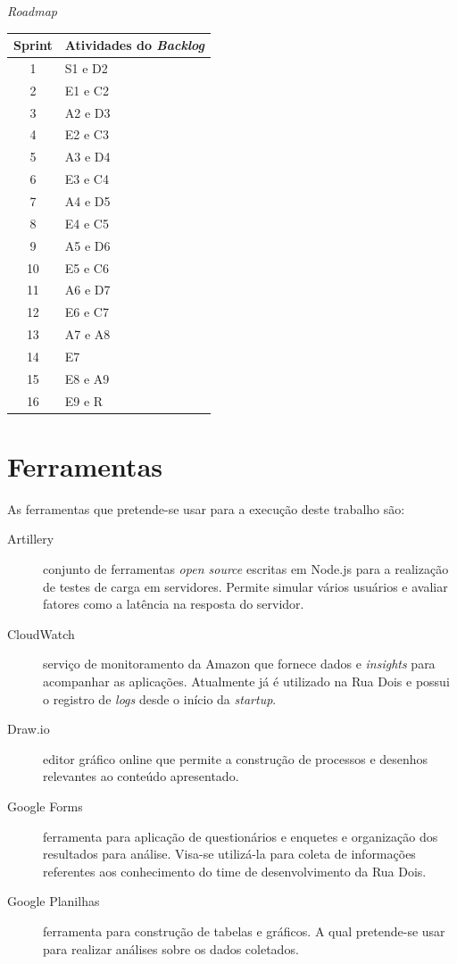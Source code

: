 \begin{quadro}
    \caption{\textit{Roadmap}\label{quad:Roadmap}}
    \begin{tabular}{ | c | l | }
    \hline
    \textbf{Sprint} &
        \textbf{Atividades do \textit{Backlog}} \\ \hline
        1 & S1 e D2 \\ \hline
        2 & E1 e C2 \\ \hline
        3 & A2 e D3 \\ \hline
        4 & E2 e C3 \\ \hline
        5 & A3 e D4 \\ \hline
        6 & E3 e C4 \\ \hline
        7 & A4 e D5 \\ \hline
        8 & E4 e C5 \\ \hline
        9 & A5 e D6 \\ \hline
        10 & E5 e C6 \\ \hline
        11 & A6 e D7 \\ \hline
        12 & E6 e C7 \\ \hline
        13 & A7 e A8 \\ \hline
        14 & E7 \\ \hline
        15 & E8 e A9 \\ \hline
        16 & E9 e R \\ \hline
    \end{tabular}
\end{quadro}

\section{Ferramentas}

As ferramentas que pretende-se usar para a execução deste trabalho são:

\begin{description}
    \item[Artillery] conjunto de ferramentas \textit{open source} escritas em Node.js
    para a realização de testes de carga em servidores. Permite simular vários usuários
    e avaliar fatores como a latência na resposta do servidor.
    \item[CloudWatch] serviço de monitoramento da Amazon que fornece dados e
    \textit{insights} para acompanhar as aplicações. Atualmente já é utilizado na
    Rua Dois e possui o registro de \textit{logs} desde o início da \textit{startup}.
    \item[Draw.io] editor gráfico online que permite a construção de processos e
    desenhos relevantes ao conteúdo apresentado.
    \item[Google Forms] ferramenta para aplicação de questionários e enquetes
    e organização dos resultados para análise. Visa-se utilizá-la para coleta
    de informações referentes aos conhecimento do time de desenvolvimento da Rua Dois.
    \item[Google Planilhas] ferramenta para construção de tabelas e gráficos.
    A qual pretende-se usar para realizar análises sobre os dados coletados.
\end{description}

